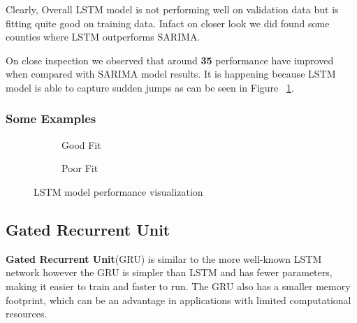 \documentclass{article}
\begin{document}
Clearly, Overall LSTM model is not performing well on validation data but is fitting quite good on training data. Infact on closer look we did found some counties where LSTM outperforms SARIMA. 

On close inspection we observed that around \textbf{35} performance have improved when compared with SARIMA model results. It is happening because LSTM model is able to capture sudden jumps as can be seen in Figure ~\ref{fig:lstm_good}. 

\newpage
\subsubsection{Some Examples}

\begin{figure}[h]
	\centering
	\vspace{1em}
	\begin{subfigure}{0.45\textwidth}
		\caption{Good Fit}
		\label{fig:lstm_good}
	\end{subfigure}
	\begin{subfigure}{0.45\textwidth}
		\caption{Poor Fit}
		\label{fig:lstm_poor}
	\end{subfigure}
	\caption{LSTM model performance visualization}
	\label{fig:lstm_both}
\end{figure}



\subsection{Gated Recurrent Unit}

\vspace{1em}

\textbf{Gated Recurrent Unit}(GRU) is similar to the more well-known LSTM network however the GRU is simpler than LSTM and has fewer parameters, making it easier to train and faster to run. The GRU also has a smaller memory footprint, which can be an advantage in applications with limited computational resources.

\vspace{1em}
\end{document}
